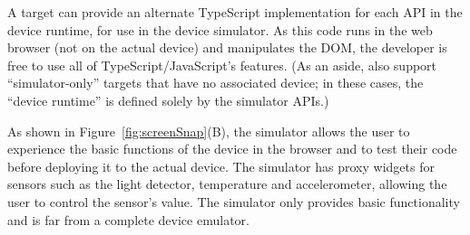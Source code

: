 A \MC target can provide an alternate TypeScript implementation for each API in the device runtime, for use in the device
simulator. As this code runs in the web browser (not on the actual device) and manipulates the DOM, the developer is free to
use all of TypeScript/JavaScript's features. (As an aside, \MC also support ``simulator-only'' targets that have no 
associated device; in these cases, the ``device runtime'' is defined solely by the simulator APIs.) 

As shown in Figure~\ref{fig:screenSnap}(B), the simulator allows the user to experience the basic functions of the device 
in the browser and to test their code
before deploying it to the actual device. The simulator has proxy widgets for sensors such as the 
light detector, temperature and accelerometer, allowing the user to control the sensor's value.  
The simulator only provides basic functionality
and is far from a complete device emulator. 



